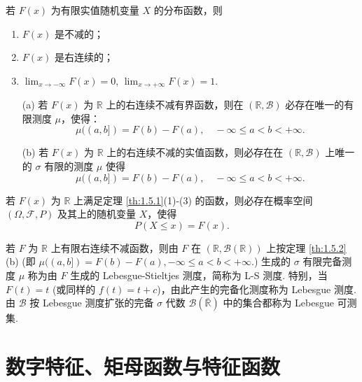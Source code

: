 \documentclass[lang=cn,10pt,thmcnt=section]{elegantbook}
\begin{document}
\begin{theorem}\label{th:1.5.1}
	若 $F(x)$ 为有限实值随机变量 $X$ 的分布函数，则
\begin{enumerate}
    \item $F(x)$ 是不减的；
    \item $F(x)$ 是右连续的；
    \item $\lim_{x \to -\infty} F(x) = 0$, $\lim_{x \to +\infty} F(x) = 1$.
\end{enumerate}
\end{theorem}

\begin{theorem}\label{th:1.5.2}
	\begin{enumerate}
		\item[(a)]若 $F(x)$ 为 $\mathbb{R}$ 上的右连续不减有界函数，则在 $(\mathbb{R}, \mathcal{B})$ 必存在唯一的有限测度 $\mu$，使得：
		\[
		\mu((a, b]) = F(b) - F(a), \quad -\infty \leq a < b < +\infty.
		\]
		\item[(b)] 若 $F(x)$ 为 $\mathbb{R}$ 上的右连续不减的实值函数，则必存在在 $(\mathbb{R}, \mathcal{B})$ 上唯一的 $\sigma$ 有限的测度 $\mu$ 使得
		\[
		\mu((a, b]) = F(b) - F(a), \quad -\infty \leq a < b < +\infty.
		\]
	\end{enumerate}
\end{theorem}
\begin{theorem}
	若 $F(x)$ 为 $\mathbb{R}$ 上满足定理 \ref{th:1.5.1}(1)-(3) 的函数，则必存在概率空间 $(\Omega, \mathcal{F}, P)$ 及其上的随机变量 $X$，使得
\[
P(X \leq x) = F(x).
\]
\end{theorem}
\begin{definition}
	若 $F$ 为 $\mathbb{R}$ 上有限右连续不减函数，则由 $F$ 在 $(\mathbb{R}, \mathcal{B}(\mathbb{R}))$ 上按定理 \ref{th:1.5.2}(b) (即 $\mu((a, b]) = F(b) - F(a), -\infty \leq a < b < +\infty$.) 生成的 $\sigma$ 有限完备测度 $\mu$ 称为由 $F$ 生成的 Lebesgue-Stieltjes 测度，简称为 L-S 测度. 特别，当 $F(t) = t$ (或同样的 $f(t) = t + c$)，由此产生的完备化测度称为 Lebesgue 测度. 由 $\mathcal{B}$ 按 Lebesgue 测度扩张的完备 $\sigma$ 代数 $\mathcal{B}(\bar{\mathbb{R}})$ 中的集合都称为 Lebesgue 可测集.
\end{definition}

\section{数字特征、矩母函数与特征函数}
\end{document}
